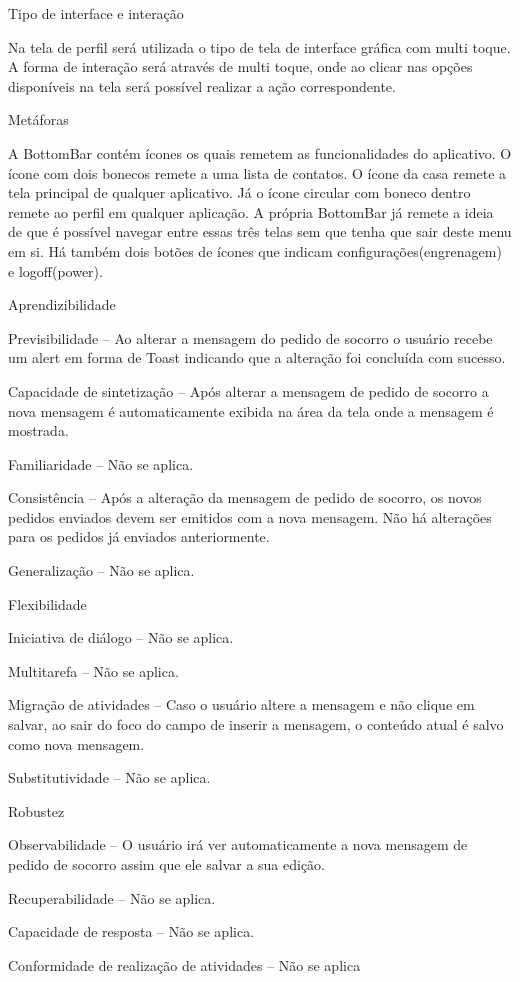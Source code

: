 \begin{alineas}
  \item Tipo de interface e interação
  
Na tela de perfil será utilizada o tipo de tela de interface gráfica com multi toque. A forma de interação será através de multi toque, onde ao clicar nas opções disponíveis na tela será possível realizar a ação correspondente. 
  \item Metáforas
  
A BottomBar contém ícones os quais remetem as funcionalidades do aplicativo. O ícone com dois bonecos remete a uma lista de contatos. O ícone da casa remete a tela principal de qualquer aplicativo. Já o ícone circular com boneco dentro remete ao perfil em qualquer aplicação. A própria BottomBar já remete a ideia de que é possível navegar entre essas três telas sem que tenha que sair deste menu em si. Há também dois botões de ícones que indicam configurações(engrenagem) e logoff(power).
  \item Aprendizibilidade
  
Previsibilidade – Ao alterar a mensagem do pedido de socorro o usuário recebe um alert em forma de Toast indicando que a alteração foi concluída com sucesso. 

Capacidade de sintetização – Após alterar a mensagem de pedido de socorro a nova mensagem é automaticamente exibida na área da tela onde a mensagem é mostrada.

Familiaridade – Não se aplica.

Consistência – Após a alteração da mensagem de pedido de socorro, os novos pedidos enviados devem ser emitidos com a nova mensagem. Não há alterações para os pedidos já enviados anteriormente.

Generalização – Não se aplica.

  \item Flexibilidade
  
Iniciativa de diálogo – Não se aplica.

Multitarefa – Não se aplica.

Migração de atividades – Caso o usuário altere a mensagem e não clique em salvar, ao sair do foco do campo de inserir a mensagem, o conteúdo atual é salvo como nova mensagem.

Substitutividade – Não se aplica.

  \item Robustez
  
Observabilidade – O usuário irá ver automaticamente a nova mensagem de pedido de socorro assim que ele salvar a sua edição.

Recuperabilidade – Não se aplica.

Capacidade de resposta – Não se aplica.

Conformidade de realização de atividades – Não se aplica

\end{alineas}
